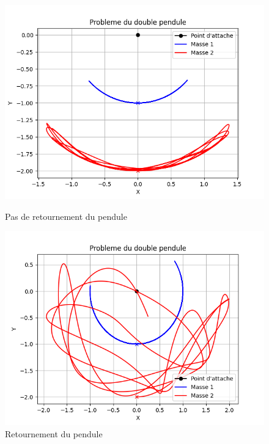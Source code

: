 \begin{figure} [htbp!]
	\begin{minipage}[c]{0.5\textwidth}
		\centering
		\includegraphics[width=\textwidth]{res/no_retournement.png}
		\caption{Pas de retournement du pendule}
		\label{fig:no_retournement}
	\end{minipage}\hfill
	\begin{minipage}[c]{0.5\textwidth}
		\centering
		\includegraphics[width=\textwidth]{res/retournement.png}
		\caption{Retournement du pendule}
		\label{fig:retournement}
	\end{minipage}
\end{figure}
